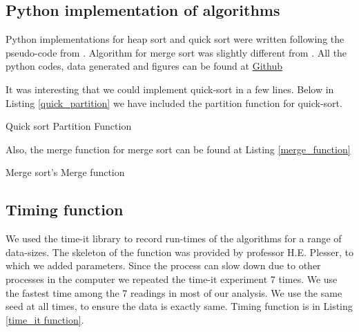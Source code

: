 \documentclass[sigconf, nonacm, natbib, screen, balance=False]{acmart}
\begin{document}
\subsection{Python implementation of algorithms}\label{sec:python implementation}

Python implementations for heap sort and quick sort were written following the pseudo-code from \citet{CLRS_2009}. Algorithm for merge sort was slightly different from \citet{CLRS_2009}. All the python codes, data generated and figures can be found at \href{https://github.com/vsnupoudel/termpaper01.}{Github} 

It was interesting that we could implement quick-sort in a few lines. Below in Listing \ref{quick_partition} we have included the partition function
for quick-sort.
\begin{listing}
  \caption{Quick sort Partition Function}
  \label{quick_partition}

\end{listing}

Also, the merge function for merge sort can be found at Listing \ref{merge_function}

\begin{listing}
  \caption{Merge sort's Merge function}
  \label{merge_function}

\end{listing}

\subsection{Timing function}\label{sec:timing function}

We used the time-it library to record run-times of the algorithms for a range of data-sizes. The skeleton of the function was provided by professor H.E. Plesser, to which we added parameters. Since the process can slow down due to other processes in the computer we repeated the time-it experiment 7 times. We use the fastest time among the 7 readings in most of our analysis. We use the same seed at all times, to ensure the data is exactly same. Timing function is in Listing \ref{time_it function}.
\end{document}
